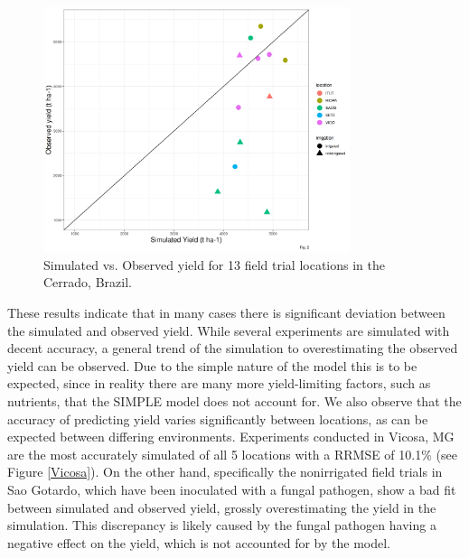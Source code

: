 \documentclass[11pt]{article}
\begin{document}
\begin{figure}[htbp]
\centering
\includegraphics[width=0.8\textwidth]{../results/experimental-data/2023-02-18_Obs_Sim_all_415.png}
\caption{\label{obs-sim}Simulated vs. Observed yield for 13 field trial locations in the Cerrado, Brazil.}
\end{figure}

These results indicate that in many cases there is significant deviation between the simulated and observed yield. While several experiments are simulated with decent accuracy, a general trend of the simulation to overestimating the observed yield can be observed. Due to the simple nature of the model this is to be expected, since in reality there are many more yield-limiting factors, such as nutrients, that the SIMPLE model does not account for.
We also observe that the accuracy of predicting yield varies significantly between locations, as can be expected between differing environments. Experiments conducted in Vicosa, MG are the most accurately simulated of all 5 locations with a RRMSE of 10.1\% (see Figure \ref{Vicosa}). On the other hand, specifically the nonirrigated field trials in Sao Gotardo, which  have been inoculated with a fungal pathogen, show a bad fit between simulated and observed yield, grossly overestimating the yield in the simulation. This discrepancy is likely caused by the fungal pathogen having a negative effect on the yield, which is not accounted for by the model.


\begin{table}[H]
\centering
\caption{Model statistics}
\label{stats}
\end{table}
\end{document}
